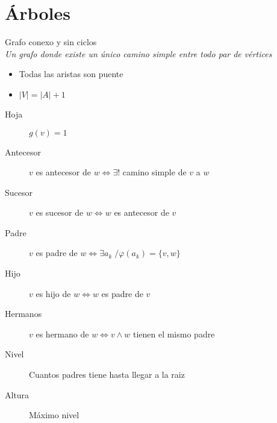 \documentclass[a4paper]{article}
\numberwithin{equation}{section}
\numberwithin{figure}{section}
\numberwithin{table}{section}
\newcommand{\refa}[1]{}
\begin{document}

\section{\'Arboles}
Grafo conexo y sin ciclos\\
\emph{Un grafo donde existe un \'unico camino simple entre todo par de v\'ertices}
\begin{itemize}
	\item Todas las aristas son puente\refa{puente}
    \item $|V| = |A| +1$
\end{itemize}
\begin{description}
	\item[Hoja] $g(v) = 1$
    \item[Antecesor] $v$ es antecesor de $w \iff \exists ! $ camino simple\refa{camino simple} de $v$ a $w$
    \item[Sucesor] $v$ es sucesor de $w \iff w$ es antecesor de $v$
    \item[Padre] $v$ es padre de $w \iff \exists a_k \;/ \varphi(a_k) = \{v, w\}$
    \item[Hijo] $v$ es hijo de $w \iff w$ es padre de $v$
    \item[Hermanos] $v$ es hermano de $w \iff v \land w$ tienen el mismo padre
    \item[Nivel] Cuantos padres tiene hasta llegar a la raiz
    \item[Altura] M\'aximo nivel
\end{description}
\end{document}
